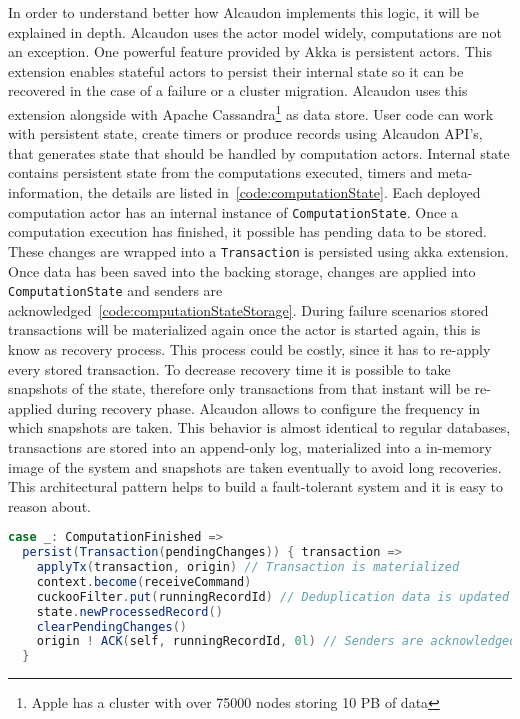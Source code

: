 In order to understand better how Alcaudon implements this logic, it will be
explained in depth. Alcaudon uses the actor model widely, computations are not
an exception. One powerful feature provided by Akka is persistent actors. This
extension enables stateful actors to persist their internal state so it can be
recovered in the case of a failure or a cluster migration. Alcaudon uses this
extension alongside with Apache Cassandra\footnote{Apple has a cluster with over
  75000 nodes storing 10 PB of data} as data store. User code can work with
persistent state, create timers or produce records using Alcaudon \acs{API}'s,
that generates state that should be handled by computation actors. Internal
state contains persistent state from the computations executed, timers and
meta-information, the details are listed in~\ref{code:computationState}. Each
deployed computation actor has an internal instance of
\lstinline[columns=fixed]{ComputationState}. Once a computation execution has
finished, it possible has pending data to be stored. These changes are wrapped
into a \lstinline[columns=fixed]{Transaction} is persisted using akka extension.
Once data has been saved into the backing storage, changes are applied into
\lstinline[columns=fixed]{ComputationState} and senders are
acknowledged~\ref{code:computationStateStorage}. During failure scenarios stored
transactions will be materialized again once the actor is started again, this is
know as recovery process. This process could be costly, since it has to re-apply
every stored transaction. To decrease recovery time it is possible to take
snapshots of the state, therefore only transactions from that instant will be
re-applied during recovery phase. Alcaudon allows to configure the frequency in
which snapshots are taken. This behavior is almost identical to regular
databases, transactions are stored into an append-only log, materialized into a
in-memory image of the system and snapshots are taken eventually to avoid long
recoveries. This architectural pattern helps to build a fault-tolerant system
and it is easy to reason about.

\begin{lstlisting}[language=scala, frame=trBL, label=code:computationStateStorage, float=ht, caption = {Computation state persistence}]
case _: ComputationFinished =>
  persist(Transaction(pendingChanges)) { transaction =>
    applyTx(transaction, origin) // Transaction is materialized
    context.become(receiveCommand)
    cuckooFilter.put(runningRecordId) // Deduplication data is updated
    state.newProcessedRecord()
    clearPendingChanges()
    origin ! ACK(self, runningRecordId, 0l) // Senders are acknowledged
  }
\end{lstlisting}

